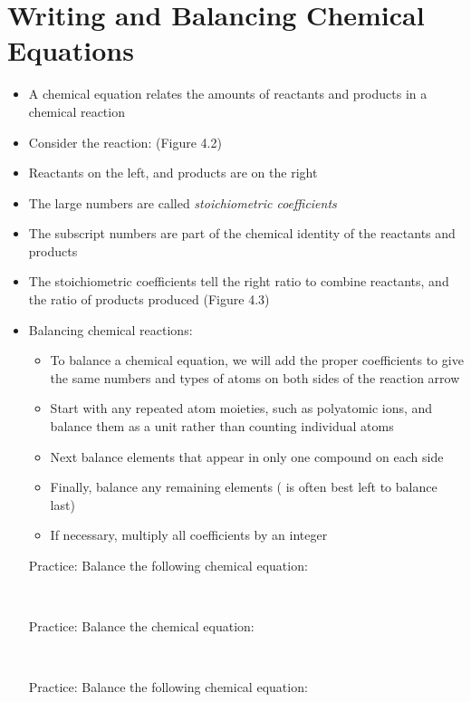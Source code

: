 \documentclass[12pt, openany, letterpaper]{memoir}
\begin{document}
\section{Writing and Balancing Chemical Equations}
\begin{itemize}
  \item A chemical equation relates the amounts of reactants and products in a chemical reaction
  \item Consider the reaction:  (Figure 4.2)
  \item Reactants on the left, and products are on the right
  \item The large numbers are called \emph{stoichiometric coefficients}
  \item The subscript numbers are part of the chemical identity of the reactants and products
  \item The stoichiometric coefficients tell the right ratio to combine reactants, and the ratio of products produced (Figure 4.3)
  \item Balancing chemical reactions:
    \begin{itemize}
      \item To balance a chemical equation, we will add the proper coefficients to give the same numbers and types of atoms on both sides of the reaction arrow
      \item Start with any repeated atom moieties, such as polyatomic ions, and balance them as a unit rather than counting individual atoms
      \item Next balance elements that appear in only one compound on each side
      \item Finally, balance any remaining elements ( is often best left to balance last)
      \item If necessary, multiply all coefficients by an integer
    \end{itemize}
  Practice: Balance the following chemical equation: 

  ~\hphantom{Practice:} 

  Practice: Balance the chemical equation: 

  ~\hphantom{Practice:} 

  Practice: Balance the following chemical equation: 


\end{itemize}
\end{document}
